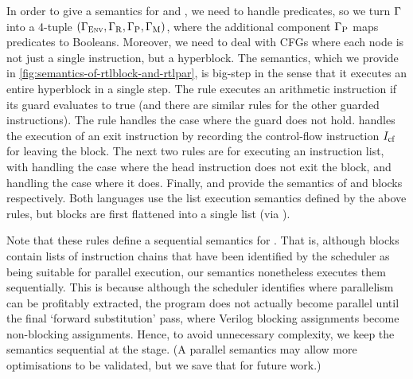 In order to give a semantics for \rtlblock{} and \rtlpar{}, we need to handle
predicates, so we turn $\Gamma$ into a 4-tuple
$(\Gamma_{\mathrm{\textsc{Env}}}, \Gamma_{\mathrm{R}}, \Gamma_{\mathrm{P}},
\Gamma_{\mathrm{M}})$, where the additional component
$\Gamma_{\mathrm{P}}$ maps predicates to Booleans.  Moreover, we need to
deal with CFGs where each node is not just a single instruction, but a
hyperblock. The semantics, which we provide in
\cref{fig:semantics-of-rtlblock-and-rtlpar}, is big-step in the sense that it
executes an entire hyperblock in a single step.  The 
rule executes an arithmetic instruction if its guard evaluates to true (and
there are similar rules for the other guarded instructions). The
 rule handles the case where the guard does not
hold.  handles the execution of an exit instruction by
recording the control-flow instruction $I_{\mathrm{cf}}$ for leaving the block. The
next two rules are for executing an instruction list, with
 handling the case where the head instruction does
not exit the block, and  handling the case where it
does. Finally,  and  provide
the semantics of \rtlblock{} and \rtlpar{} blocks respectively. Both languages
use the list execution semantics defined by the above rules, but \rtlpar{}
blocks are first flattened into a single list (via ).

Note that these rules define a sequential semantics for \rtlpar{}. That is,
although \rtlpar{} blocks contain lists of instruction chains that have been
identified by the scheduler as being suitable for parallel execution, our
semantics nonetheless executes them sequentially. This is because although the
scheduler identifies where parallelism can be profitably extracted, the program
does not actually become parallel until the final `forward substitution' pass,
where Verilog blocking assignments become non-blocking assignments. Hence, to
avoid unnecessary complexity, we keep the semantics sequential at the \rtlpar{}
stage. (A parallel \rtlpar{} semantics may allow more optimisations to be
validated, but we save that for future work.)

\newcommand\cons{\mathbin{::}}

